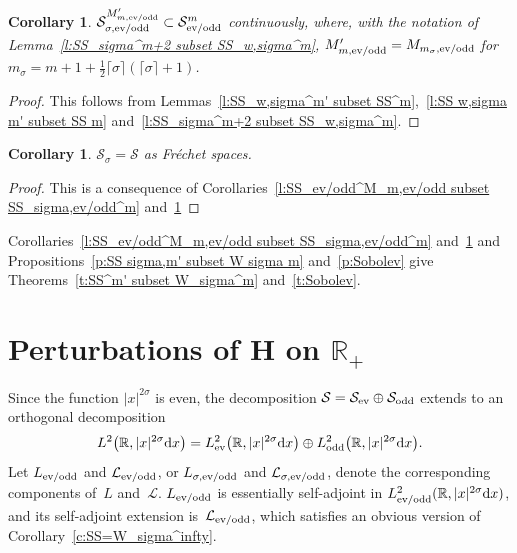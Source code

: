\documentclass[11pt]{article}
\newtheorem{Corollary}[Theorem]{Corollary}
\newcommand{\R}{\mathbb{R}}
\newcommand{\LL}{\mathcal{L}}
\renewcommand{\SS}{\mathcal{S}}
\begin{document}
\begin{Corollary}\label{c:SS_sigma^m' subset SS^m}
  $\SS_{\sigma,\text{\rm ev/odd}}^{M'_{m,\text{\rm ev/odd}}}\subset\SS_{\text{\rm ev/odd}}^m$ continuously, where, with the notation of Lemma~{\rm \ref{l:SS_sigma^m+2 subset SS_w,sigma^m}}, $M'_{m,\text{\rm ev/odd}}=M_{m_\sigma,\text{\rm ev/odd}}$ for $m_\sigma=m+1+\frac{1}{2}\lceil\sigma\rceil(\lceil\sigma\rceil+1)$.
\end{Corollary}

\begin{proof}
  This follows from Lemmas~\ref{l:SS_w,sigma^m' subset SS^m},~\ref{l:SS w,sigma m' subset SS m} and~\ref{l:SS_sigma^m+2 subset SS_w,sigma^m}.
\end{proof}

\begin{Corollary}\label{c:SS_sigma = SS}
  $\SS_\sigma=\SS$ as Fr\'echet spaces.
\end{Corollary}

\begin{proof}
  This is a consequence of Corollaries~\ref{l:SS_ev/odd^M_m,ev/odd subset SS_sigma,ev/odd^m} and~\ref{c:SS_sigma^m' subset SS^m}
\end{proof}

Corollaries~\ref{l:SS_ev/odd^M_m,ev/odd subset SS_sigma,ev/odd^m} and~\ref{c:SS_sigma^m' subset SS^m} and Propositions~\ref{p:SS sigma,m' subset W sigma m} and~\ref{p:Sobolev} give Theorems~\ref{t:SS^m' subset W_sigma^m} and~\ref{t:Sobolev}.


\section[Perturbations of $H$ on $\R_+$]{Perturbations of $\boldsymbol{H}$ on $\boldsymbol{\R_+}$}\label{s:P}

Since the function $|x|^{2\sigma}$ is even, the decomposition $\SS=\SS_{\text{\rm ev}}\oplus\SS_{\text{\rm odd}}$ extends to an orthogonal decomposition
\[
    L^2\big(\R,|x|^{2\sigma}{\rm d}x\big)
    =L^2_{\text{\rm ev}}\big(\R,|x|^{2\sigma}{\rm d}x\big)\oplus L^2_{\text{\rm odd}}\big(\R,|x|^{2\sigma}{\rm d}x\big) .
\]
Let $L_{\text{\rm ev/odd}}$ and $\LL_{\text{\rm ev/odd}}$, or $L_{\sigma,\text{\rm ev/odd}}$ and $\LL_{\sigma,\text{\rm ev/odd}}$, denote the corresponding components of~$L$ and~$\LL$. $L_{\text{\rm ev/odd}}$ is essentially self-adjoint in $L^2_{\text{\rm ev/odd}}(\R,|x|^{2\sigma}{\rm d}x)$, and its self-adjoint extension is~$\LL_{\text{\rm ev/odd}}$, which satisf\/ies an obvious version of Corollary~\ref{c:SS=W_sigma^infty}.
\end{document}
